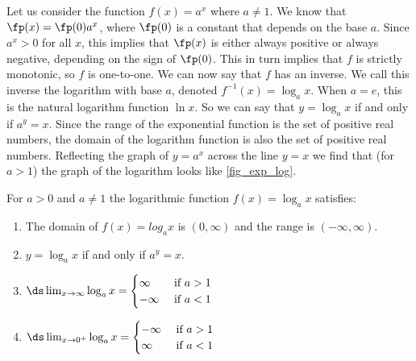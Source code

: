 Let us consider the function $f(x)=a^x$ where $a\neq1$. We know that $\fp(x)=\fp(0)a^x$, where $\fp(0)$ is a constant that depends on the base $a$. Since $a^x>0$ for all $x$, this implies that $\fp(x)$ is either always positive or always negative, depending on the sign of $\fp(0)$. This in turn implies that $f$ is strictly monotonic, so $f$ is one-to-one. We can now say that $f$ has an inverse. We call this inverse the logarithm with base $a$, denoted $f^{-1}(x)=\log_ax$. When $a=e$, this is the natural logarithm function $\ln x$. So we can say that $y=\log_a x$ if and only if $a^y=x$. Since the range of the exponential function is the set of positive real numbers, the domain of the logarithm function is also the set of positive real numbers. Reflecting the graph of $y=a^x$ across the line $y=x$ we find that (for $a>1$) the graph of the logarithm looks like \autoref{fig_exp_log}.

\begin{keyidea}\label{ki_log_func_props}%
For $a>0$ and $a\ne1$ the logarithmic function $f(x)=\log_a x$ satisfies:
\begin{enumerate}
\item The domain of $f(x)=log_a x$ is $(0,\infty)$ and the range is $(-\infty,\infty)$.
\item $y=\log_a x$ if and only if $a^y=x$.
\item $\ds\lim_{x\to\infty}\log_a x=
\begin{cases}\infty&\text{ if $a>1$}\\ -\infty&\text{ if $a<1$}\end{cases}$
\item $\ds\lim_{x\to0^+}\log_a x=\begin{cases}-\infty&\text{ if $a>1$}\\\infty&\text{ if $a<1$}\end{cases}$
\end{enumerate}
\end{keyidea}

